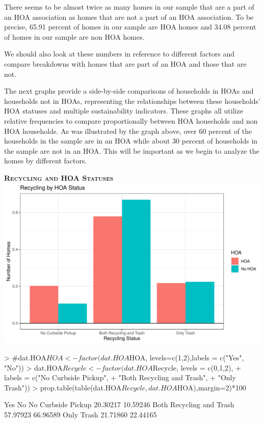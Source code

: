 \documentclass{article}
\begin{document}
There seems to be almost twice as many homes in our sample that are a part of an HOA association as homes that are not a part of an HOA association. To be precise, 65.91 percent of homes in our sample are HOA homes and 34.08 percent of homes in our sample are non HOA homes. 


We should also look at these numbers in reference to different factors and compare breakdowns with homes that are part of an HOA and those that are not.


The next graphs provide a side-by-side comparisons of households in HOAs and households not in HOAs, representing the relationships between these households' HOA statuses and multiple sustainability indicators. These graphs all utilize relative frequencies to compare proportionally between HOA households and non HOA households. As was illustrated by the graph above, over 60 percent of the households in the sample are in an HOA while about 30 percent of households in the sample are not in an HOA. This will be important as we begin to analyze the homes by different factors. 

\newpage
\textsc{\textbf{Recycling and HOA Statuses}}
\newline
\newline
\includegraphics{part2-009}

\begin{Schunk}
\begin{Sinput}
> #dat.HOA$HOA<-factor(dat.HOA$HOA, levels=c(1,2),labels = c("Yes", "No"))
> dat.HOA$Recycle<-factor(dat.HOA$Recycle, levels = c(0,1,2),
+                         labels = c("No Curbside Pickup",
+                         "Both Recycling and Trash",
+                         "Only Trash"))
> prop.table(table(dat.HOA$Recycle, dat.HOA$HOA),margin=2)*100
\end{Sinput}
\begin{Soutput}
                                Yes       No
  No Curbside Pickup       20.30217 10.59246
  Both Recycling and Trash 57.97923 66.96589
  Only Trash               21.71860 22.44165
\end{Soutput}
\end{Schunk}
\end{document}
